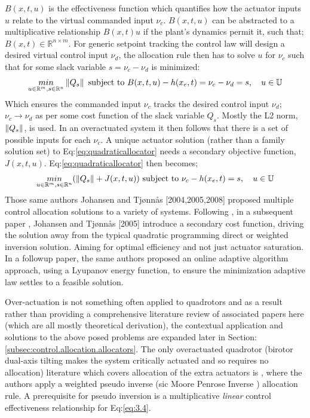 $B(x,t,u)$ is the effectiveness function which quantifies how the actuator inputs $u$ relate to the virtual commanded input $\nu_c$. $B(x,t,u)$ can be abstracted to a multiplicative relationship $B(x,t)u$ if the plant's dynamics permit it, such that; $B(x,t)\in\mathbb{R}^{n\times m}$. For generic setpoint tracking the control law will design a desired virtual control input $\nu_d$, the allocation rule then has to solve $u$ for $\nu_c$ such that for some slack variable $s=\nu_c-\nu_d$ is minimized:
\begin{equation}\label{eq:quadraticallocator}
\underset{u \in \mathbb{R}^m ,s \in \mathbb{R}^n}{min}\left\lVert Q_s\right\rVert ~\text{subject to} ~B(x,t,u) - h(x_e,t)=\nu_c-\nu_d=s,~~~u \in \mathbb{U}
\end{equation}
Which ensures the commanded input $\nu_c$ tracks the desired control input $\nu_d$; $\nu_c\rightarrow\nu_d$ as per some cost function of the slack variable $Q_s$. Mostly the L2 norm, $\left\lVert Q_s\right\rVert$, is used. In an overactuated system it then follows that there is a set of possible inputs for each $\nu_c$. A unique actuator solution (rather than a family solution set) to Eq:\ref{eq:quadraticallocator} needs a secondary objective function, $J(x,t,u)$. Eq:\ref{eq:quadraticallocator} then becomes;
\begin{equation} \label{eq:quadraticallocatorcost}
\underset{u \in \mathbb{R}^m ,s \in \mathbb{R}^n}{min}(\left\lVert Q_s\right\rVert+J(x,t,u)) ~\text{subject to} ~\nu_c - h(x_e,t)=s, ~~~u \in \mathbb{U}
\end{equation}
\newpage
Those same authors Johansen and Tjønnås [2004,2005,2008] proposed multiple control allocation solutions to a variety of systems. Following \cite{allocation}, in a subsequent paper \cite{efficientallocation}, Johansen and Tjønnås [2005] introduce a secondary cost function, driving the solution away from the typical quadratic programming direct or weighted inversion solution. Aiming for optimal efficiency and not just actuator saturation. In a followup paper\cite{adaptiveallocation}, the same authors proposed an online adaptive algorithm approach, using a Lyupanov energy function, to ensure the minimization adaptive law settles to a feasible solution.
\par
Over-actuation is not something often applied to quadrotors and as a result rather than providing a comprehensive literature review of associated papers here (which are all mostly theoretical derivation), the contextual application and solutions to the above posed problems are expanded later in Section:\ref{subsec:control.allocation.allocators}. The only overactuated quadrotor (birotor dual-axis tilting makes the system critically actuated and so requires no allocation) literature which covers allocation of the extra actuators is \cite{tiltgasco,tiltrihani}, where the authors apply a weighted pseudo inverse (sic Moore Penrose Inverse \cite{moorepenrose}) allocation rule. A prerequisite for pseudo inversion is a multiplicative \emph{linear} control effectiveness relationship for Eq:\ref{eq:3.4}. 
